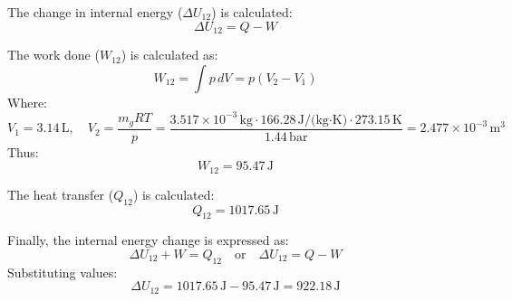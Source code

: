 The change in internal energy (\( \Delta U_{12} \)) is calculated:  
\[
\Delta U_{12} = Q - W
\]  

The work done (\( W_{12} \)) is calculated as:  
\[
W_{12} = \int p \, dV = p (V_2 - V_1)
\]  
Where:  
\[
V_1 = 3.14 \, \text{L}, \quad V_2 = \frac{m_g RT}{p} = \frac{3.517 \times 10^{-3} \, \text{kg} \cdot 166.28 \, \text{J/(kg·K)} \cdot 273.15 \, \text{K}}{1.44 \, \text{bar}} = 2.477 \times 10^{-3} \, \text{m}^3
\]  
Thus:  
\[
W_{12} = 95.47 \, \text{J}
\]  

The heat transfer (\( Q_{12} \)) is calculated:  
\[
Q_{12} = 1017.65 \, \text{J}
\]  

Finally, the internal energy change is expressed as:  
\[
\Delta U_{12} + W = Q_{12} \quad \text{or} \quad \Delta U_{12} = Q - W
\]  
Substituting values:  
\[
\Delta U_{12} = 1017.65 \, \text{J} - 95.47 \, \text{J} = 922.18 \, \text{J}
\]